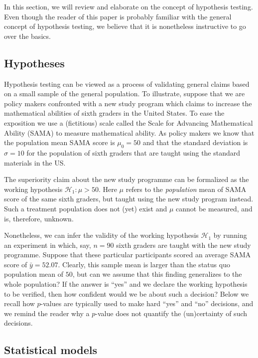 \documentclass[english,,doc,floatsintext]{apa6}
\begin{document}
In this section, we will review and elaborate on the concept of hypothesis testing. Even though the reader of this paper is probably familiar with the general concept of hypothesis testing, we believe that it is nonetheless instructive to go over the basics.

\hypertarget{hypotheses}{%
\subsection{Hypotheses}\label{hypotheses}}

Hypothesis testing can be viewed as a process of validating general claims based on a small sample of the general population. To illustrate, suppose that we are policy makers confronted with a new study program which claims to increase the mathematical abilities of sixth graders in the United States. To ease the exposition we use a (fictitious) scale called the Scale for Advancing Mathematical Ability (SAMA) to measure mathematical ability. As policy makers we know that the population mean SAMA score is \(\mu_{0}=50\) and that the standard deviation is \(\sigma=10\) for the population of sixth graders that are taught using the standard materials in the US.

The superiority claim about the new study programme can be formalized as the working hypothesis \(\mathcal{H}_{1} : \mu > 50\). Here \(\mu\) refers to the \emph{population} mean of SAMA score of the same sixth graders, but taught using the new study program instead. Such a treatment population does not (yet) exist and \(\mu\) cannot be measured, and is, therefore, unknown.

Nonetheless, we can infer the validity of the working hypothesis \(\mathcal{H}_{1}\) by running an experiment in which, say, \(n=90\) sixth graders are taught with the new study programme. Suppose that these particular participants scored an average SAMA score of \(\bar{y} = 52.07\). Clearly, this sample mean is larger than the status quo population mean of \(50\), but can we assume that this finding generalizes to the whole population? If the answer is ``yes'' and we declare the working hypothesis to be verified, then how confident would we be about such a decision? Below we recall how \(p\)-values are typically used to make hard ``yes'' and ``no'' decisions, and we remind the reader why a \(p\)-value does not quantify the (un)certainty of such decisions.

\hypertarget{statistical-models}{%
\subsection{Statistical models}\label{statistical-models}}
\end{document}
